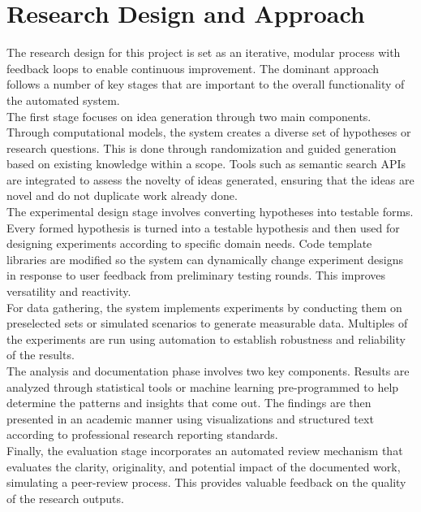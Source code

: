 \section{Research Design and Approach}
The research design for this project is set as an iterative, modular process with feedback loops to enable continuous improvement. The dominant approach follows a number of key stages that are important to the overall functionality of the automated system.\\
The first stage focuses on idea generation through two main components. Through computational models, the system creates a diverse set of hypotheses or research questions. This is done through randomization and guided generation based on existing knowledge within a scope. Tools such as semantic search APIs are integrated to assess the novelty of ideas generated, ensuring that the ideas are novel and do not duplicate work already done.\\
The experimental design stage involves converting hypotheses into testable forms. Every formed hypothesis is turned into a testable hypothesis and then used for designing experiments according to specific domain needs. Code template libraries are modified so the system can dynamically change experiment designs in response to user feedback from preliminary testing rounds. This improves versatility and reactivity.\\
For data gathering, the system implements experiments by conducting them on preselected sets or simulated scenarios to generate measurable data. Multiples of the experiments are run using automation to establish robustness and reliability of the results.\\
The analysis and documentation phase involves two key components. Results are analyzed through statistical tools or machine learning pre-programmed to help determine the patterns and insights that come out. The findings are then presented in an academic manner using visualizations and structured text according to professional research reporting standards.\\
Finally, the evaluation stage incorporates an automated review mechanism that evaluates the clarity, originality, and potential impact of the documented work, simulating a peer-review process. This provides valuable feedback on the quality of the research outputs.


